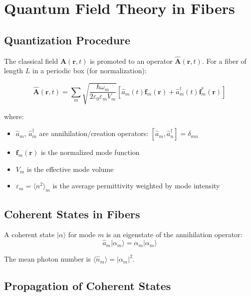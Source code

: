 \documentclass[12pt,a4paper]{article}
\begin{document}
\section{Quantum Field Theory in Fibers}

\subsection{Quantization Procedure}

The classical field $\mathbf{A}(\mathbf{r}, t)$ is promoted to an operator $\hat{\mathbf{A}}(\mathbf{r}, t)$. For a fiber of length $L$ in a periodic box (for normalization):

\begin{equation}
\hat{\mathbf{A}}(\mathbf{r}, t) = \sum_m \sqrt{\frac{\hbar \omega_m}{2\varepsilon_0 \varepsilon_m V_m}} \left[\hat{a}_m(t) \mathbf{f}_m(\mathbf{r}) + \hat{a}_m^\dagger(t) \mathbf{f}_m^*(\mathbf{r})\right] \label{eq:quantized_field}
\end{equation}

where:
\begin{itemize}[leftmargin=*]
\item $\hat{a}_m$, $\hat{a}_m^\dagger$ are annihilation/creation operators: $[\hat{a}_m, \hat{a}_n^\dagger] = \delta_{mn}$
\item $\mathbf{f}_m(\mathbf{r})$ is the normalized mode function
\item $V_m$ is the effective mode volume
\item $\varepsilon_m = \langle n^2 \rangle_m$ is the average permittivity weighted by mode intensity
\end{itemize}

\subsection{Coherent States in Fibers}

A coherent state $|\alpha\rangle$ for mode $m$ is an eigenstate of the annihilation operator:
\begin{equation}
\hat{a}_m |\alpha_m\rangle = \alpha_m |\alpha_m\rangle
\end{equation}

The mean photon number is $\langle \hat{n}_m \rangle = |\alpha_m|^2$.

\subsection{Propagation of Coherent States}
\end{document}
